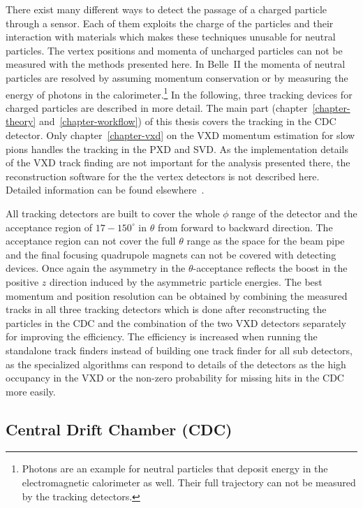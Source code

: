 There exist many different ways to detect the passage of a charged particle through a sensor. Each of them exploits the charge of the particles and their interaction with materials which makes these techniques unusable for neutral particles. The vertex positions and momenta of uncharged particles can not be measured with the methods presented here. In Belle~II the momenta of neutral particles are resolved by assuming momentum conservation or by measuring the energy of photons in the calorimeter.\footnote{Photons are an example for neutral particles that deposit energy in the electromagnetic calorimeter as well. Their full trajectory can not be measured by the tracking detectors.} In the following, three tracking devices for charged particles are described in more detail. The main part (chapter~\ref{chapter-theory} and~\ref{chapter-workflow}) of this thesis covers the tracking in the CDC detector. Only chapter~\ref{chapter-vxd} on the VXD momentum estimation for slow pions handles the tracking in the PXD and SVD.  As the implementation details of the VXD track finding are not important for the analysis presented there, the reconstruction software for the the vertex detectors is not described here. Detailed information can be found elsewhere~\cite{jakob}.

All tracking detectors are built to cover the whole $\phi$ range of the detector and the acceptance region of $17-150 ^\circ$ in $\theta$ from forward to backward direction. The acceptance region can not cover the full $\theta$ range as the space for the beam pipe and the final focusing quadrupole magnets can not be covered with detecting devices. Once again the asymmetry in the $\theta$-acceptance reflects the boost in the positive $z$ direction induced by the asymmetric particle energies. The best momentum and position resolution can be obtained by combining the measured tracks in all three tracking detectors which is done after reconstructing the particles in the CDC and the combination of the two VXD detectors separately for improving the efficiency. The efficiency is increased when running the standalone track finders instead of building one track finder for all sub detectors, as the specialized algorithms can respond to details of the detectors as the high occupancy in the VXD or the non-zero probability for missing hits in the CDC more easily. 

\subsection{Central Drift Chamber (CDC)}

